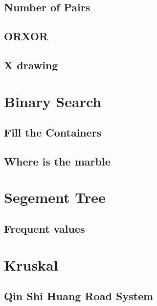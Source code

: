         \subsection{Number of Pairs}
                
        \subsection{ORXOR}
                
        \subsection{X drawing}
                

\section{Binary Search}
        \subsection{Fill the Containers}
                
        \subsection{Where is the marble}
                

\section{Segement Tree}
        \subsection{Frequent values}
                

\section{Kruskal}
        \subsection{Qin Shi Huang Road System}
                

